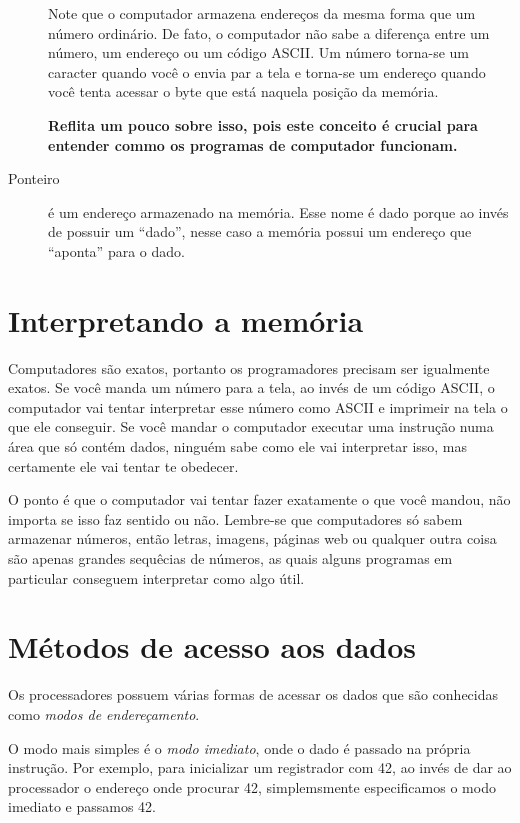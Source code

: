 \begin{description}
Note que o computador armazena endereços da mesma forma que um número ordinário. De fato, o computador não sabe a diferença entre um número, um endereço ou um código ASCII. Um número torna-se um caracter quando você o envia par a tela e torna-se um endereço quando você tenta acessar o byte que está naquela posição da memória.

\textbf{Reflita um pouco sobre isso, pois este conceito é crucial para entender commo os programas de computador funcionam.}

\item[Ponteiro] é um endereço armazenado na memória. Esse nome é dado porque ao invés de possuir um ``dado'', nesse caso a memória possui um endereço que ``aponta'' para o dado.
\end{description}

\section{Interpretando a memória}

Computadores são exatos, portanto os programadores precisam ser igualmente exatos. Se você manda um número para a tela, ao invés de um código ASCII, o computador vai tentar interpretar esse número como ASCII e imprimeir na tela o que ele conseguir. Se você mandar o computador executar uma instrução numa área que só contém dados, ninguém sabe como ele vai interpretar isso, mas certamente ele vai tentar te obedecer.

O ponto é que o computador vai tentar fazer exatamente o que você mandou, não importa se isso faz sentido ou não. Lembre-se que computadores só sabem armazenar números, então letras, imagens, páginas web ou qualquer outra coisa são apenas grandes sequêcias de números, as quais alguns programas em particular conseguem interpretar como algo útil.

\section{Métodos de acesso aos dados}

Os processadores possuem várias formas de acessar os dados que são conhecidas como \emph{modos de endereçamento}.

O modo mais simples é o \emph{modo imediato}, onde o dado é passado na própria instrução. Por exemplo, para inicializar um registrador com 42, ao invés de dar ao processador o endereço onde procurar 42, simplemsmente especificamos o modo imediato e passamos 42.

